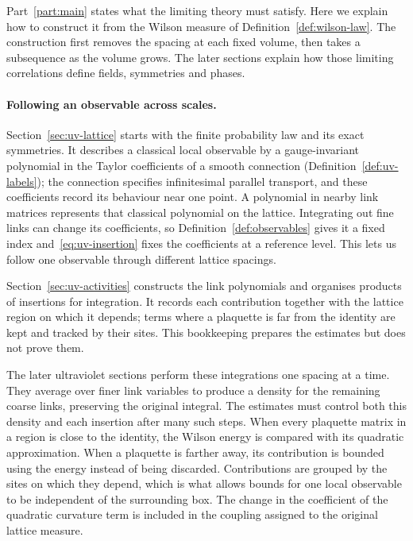 \label{sec:construction-guide}

Part~\ref{part:main} states what the limiting theory must satisfy.
Here we explain how to construct it from the Wilson measure of Definition~\ref{def:wilson-law}.
The construction first removes the spacing at each fixed volume, then takes a subsequence as the volume grows. The later sections explain how those limiting correlations define fields, symmetries and phases.

\paragraph{Following an observable across scales.}
Section~\ref{sec:uv-lattice} starts with the finite probability law and its exact symmetries.
It describes a classical local observable by a gauge-invariant polynomial in the Taylor coefficients of a smooth connection (Definition~\ref{def:uv-labels}); the connection specifies infinitesimal parallel transport, and these coefficients record its behaviour near one point.
A polynomial in nearby link matrices represents that classical polynomial on the lattice.
Integrating out fine links can change its coefficients, so Definition~\ref{def:observables} gives it a fixed index and~\eqref{eq:uv-insertion} fixes the coefficients at a reference level.
This lets us follow one observable through different lattice spacings.

Section~\ref{sec:uv-activities} constructs the link polynomials and organises products of insertions for integration.
It records each contribution together with the lattice region on which it depends; terms where a plaquette is far from the identity are kept and tracked by their sites.
This bookkeeping prepares the estimates but does not prove them.

The later ultraviolet sections perform these integrations one spacing at a time.
They average over finer link variables to produce a density for the remaining coarse links, preserving the original integral.
The estimates must control both this density and each insertion after many such steps.
When every plaquette matrix in a region is close to the identity, the Wilson energy is compared with its quadratic approximation.
When a plaquette is farther away, its contribution is bounded using the energy instead of being discarded.
Contributions are grouped by the sites on which they depend, which is what allows bounds for one local observable to be independent of the surrounding box.
The change in the coefficient of the quadratic curvature term is included in the coupling assigned to the original lattice measure.

